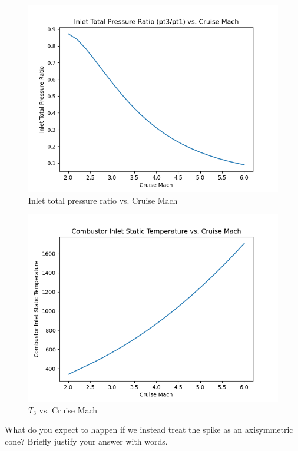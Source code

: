 \documentclass[../main.tex]{subfiles}
\begin{document}
\begin{figure}[h!]
    \centering
    \includegraphics[scale=0.6]{../../images/problem_2/tpr_vs_mach.png}
    \caption{Inlet total pressure ratio vs. Cruise Mach}
    \label{tpr_vs_mach}
\end{figure}

\begin{figure}[h!]
    \centering
    \includegraphics[scale=0.6]{../../images/problem_2/t3_vs_mach.png}
    \caption{\(T_3\) vs. Cruise Mach}
    \label{t3_vs_mach}
\end{figure}

\clearpage


What do you expect to happen if we instead treat the spike as an axisymmetric cone?
Briefly justify your answer with words.
\end{document}
